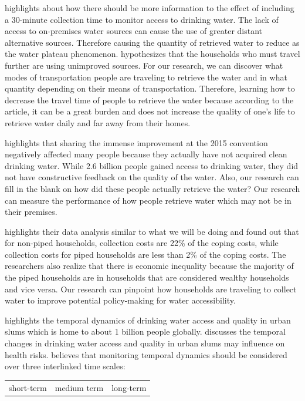 \documentclass[10pt,twoside]{article}
\numberwithin{equation}{section}
\newcommand{\?}{\stackrel{?}{=}}
\begin{document}
\citet{cassivi2018access} highlights about how there should be more information to the effect of including a 30-minute
collection time to monitor access to drinking water. The lack of access to on-premises water sources can cause the use
of greater distant alternative sources. Therefore causing the quantity of retrieved water to reduce as the water plateau
phenomenon.\citet{cassivi2018access} hypothesizes that the households who must travel further are using unimproved
sources. For our research, we can discover what modes of transportation people are traveling to retrieve the water and
in what quantity depending on their means of transportation. Therefore, learning how to decrease the travel time of
people to retrieve the water because according to the article, it can be a great burden and does not increase the
quality of one's life to retrieve water daily and far away from their homes.

\citet{tortajada2018achieving} highlights that sharing the immense improvement at the 2015 convention negatively
affected many people because they actually have not acquired clean drinking water. While 2.6 billion people gained
access to drinking water, they did not have constructive feedback on the quality of the water. Also, our research can
fill in the blank on how did these people actually retrieve the water? Our research can measure the performance of how
people retrieve water which may not be in their premises.

\citet{amit2019measuring} highlights their data analysis similar to what we will be doing and found out that for
non-piped households, collection costs are 22\% of the coping costs, while collection costs for piped households are
less than 2\% of the coping costs. The researchers also realize that there is economic inequality because the majority
of the piped households are in households that are considered wealthy households and vice versa. Our research can
pinpoint how households are traveling to collect water to improve potential policy-making for water accessibility.

\citet{price2019difference} highlights the temporal dynamics of drinking water access and quality in urban slums which
is home to about 1 billion people globally. \citet{price2019difference} discusses the temporal changes in drinking water
access and quality in urban slums may influence on health risks. \citet{price2019difference} believes that monitoring
temporal dynamics should be considered over three interlinked time scales:
\begin{center}
\begin{tabular}{ c c c }
 short-term & medium term & long-term \\ 
   
\end{tabular}
\end{center}
\end{document}
